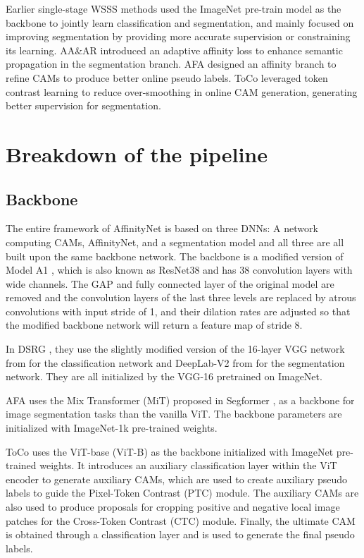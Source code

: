 Earlier single-stage WSSS methods used the ImageNet \cite{dataset_imagenet} pre-train model as the backbone to  jointly learn classification and segmentation, and mainly focused on improving segmentation by providing more accurate supervision or constraining its learning.  AA\&AR \cite{aaar} introduced an adaptive affinity loss to enhance semantic propagation in the segmentation branch. AFA \cite{wsss_afa_affinity_from_attention} designed an affinity branch to refine CAMs to produce better online pseudo labels. ToCo \cite{wsss_toco_token_contrast} leveraged token contrast learning to reduce over-smoothing in online CAM generation, generating better supervision for segmentation.


\section{Breakdown of the pipeline}
\label{sec:pipeline-breakdown}
\subsection{Backbone}
\label{subsec:backbone}

The entire framework of AffinityNet \cite{wsss_affinitynet} is based on three DNNs: A network computing CAMs, AffinityNet, and a segmentation model and all three are all built upon the same backbone network. The backbone is a modified version of Model A1 \cite{RevisitingResNET}, which is also known as ResNet38 and has 38 convolution layers with wide channels. The GAP and fully connected layer of the original model are removed and the convolution layers of the last three levels are replaced by atrous convolutions with input stride of 1, and their dilation rates are adjusted so that the modified backbone network will return a feature map of stride 8.

In DSRG \cite{wsss_dsrg_deep_seeded_region_growing}, they use the slightly modified version of the 16-layer VGG network from \cite{VGG16} for the classification network and DeepLab-V2 from \cite{fsss_deeplabv2} for the segmentation network. They are all initialized by the VGG-16 pretrained on ImageNet.

AFA \cite{wsss_afa_affinity_from_attention} uses the Mix Transformer (MiT) proposed in Segformer \cite{fsss_segformer}, as a backbone for image segmentation tasks than the vanilla ViT. The backbone parameters are initialized with ImageNet-1k pre-trained weights.

ToCo \cite{wsss_toco_token_contrast} uses the ViT-base (ViT-B) as the backbone initialized with ImageNet pre-trained weights. It  introduces an auxiliary classification layer within the ViT encoder to generate auxiliary CAMs, which are used to create auxiliary pseudo labels to guide the Pixel-Token Contrast (PTC) module. The auxiliary CAMs are also used to produce proposals for cropping positive and negative local image patches for the Cross-Token Contrast (CTC) module. Finally, the ultimate CAM is obtained through a classification layer and is used to generate the final pseudo labels.

